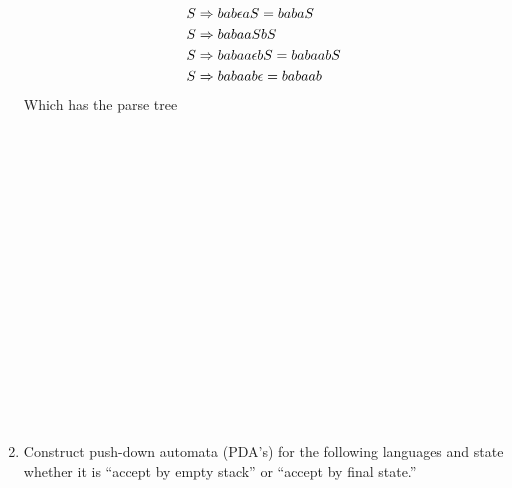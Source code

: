 \documentclass[10pt,a4paper,final]{article}
\begin{document}
\begin{enumerate}
\begin{align}
  \setcounter{equation}{2}
  S &\Rightarrow bab \epsilon aS = babaS \\
  \setcounter{equation}{0}
  S &\Rightarrow baba aSbS \\
  \setcounter{equation}{2}
  S &\Rightarrow babaa \epsilon bS = babaabS \\
  \setcounter{equation}{2}
  S &\Rightarrow babaab \epsilon = babaab
\end{align}
Which has the parse tree
\\ \\ \\ \\ \\ \\ \\ \\ \\ \\ \\ \\ \\ \\ \\ \\ \\

\item %
Construct push-down automata (PDA's) for the following languages and state whether it is
``accept by empty stack'' or ``accept by final state.''


\end{enumerate}
\end{document}
